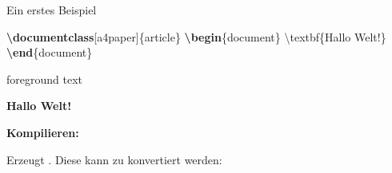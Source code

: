 \documentclass[aspectratio=169]{beamer}
\newenvironment{Shaded}{\begin{snugshade}}{\end{snugshade}}
\newcommand{\BuiltInTok}[1]{\textcolor[rgb]{0.25,0.67,0.19}{\textbf{#1}}}
\newcommand{\ExtensionTok}[1]{\textcolor[rgb]{0.25,0.67,0.19}{#1}}
\newcommand{\FunctionTok}[1]{\textcolor[rgb]{0.34,0.51,0.35}{#1}}
\newcommand{\KeywordTok}[1]{\textcolor[rgb]{0.25,0.67,0.19}{\textbf{#1}}}
\newcommand{\NormalTok}[1]{\textcolor[rgb]{0.19,0.19,0.19}{#1}}
\newenvironment{Shaded}{}{}
\newcommand\citestyle[1]{\textcolor{foreground-secondary}{\textsuperscript{#1}}}
\let\oldautocite\autocite
\renewcommand{\autocite}[1]{\citestyle{\oldautocite{#1}}}
\newcommand{\link}[1]{\alert{\underline{#1}}}
\begin{document}
    \begin{frame}[fragile]{Ein erstes Beispiel}
    \protect\hypertarget{ein-erstes-beispiel}{}
    \newcommand\beispielDvi{
        \textattachfile[mimetype=application/x-dvi]{beispiele/beispiel.dvi}{\link{beispiel.dvi}}
    }
    \newcommand\beispielPdf{
        \textattachfile[mimetype=application/x-pdf]{beispiele/beispiel.pdf}{\link{beispiel.pdf}}
    }

    \begin{minipage}{0.66\textwidth}

\begin{Shaded}
\begin{Highlighting}[]
\BuiltInTok{\textbackslash{}documentclass}\NormalTok{[a4paper]\{}\ExtensionTok{article}\NormalTok{\}}
\KeywordTok{\textbackslash{}begin}\NormalTok{\{}\ExtensionTok{document}\NormalTok{\}}
    \FunctionTok{\textbackslash{}textbf}\NormalTok{\{Hallo Welt!\}}
\KeywordTok{\textbackslash{}end}\NormalTok{\{}\ExtensionTok{document}\NormalTok{\}}
\end{Highlighting}
\end{Shaded}

    \end{minipage}\begin{minipage}{0.33\textwidth}

    \bgroup 
        \begin{OutputBox}
        \begin{beamercolorbox}{foreground text}
            \selectfont%

        \textbf{Hallo Welt!}

            \end{beamercolorbox}
        \end{OutputBox}
    \egroup

    \end{minipage}

    \vspace{0.5\baselineskip}

    \textbf{Kompilieren:}

\begin{Shaded}
\end{Shaded}

    Erzeugt
        .
    Diese kann zu
         konvertiert
    werden\autocite{ctan-dvipdfmx}:


\end{frame}
\end{document}
